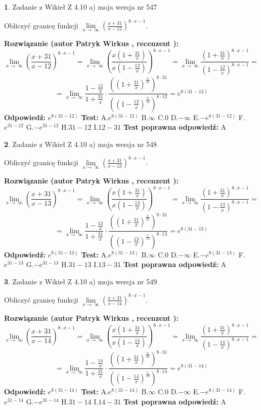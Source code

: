 \documentclass[12pt, a4paper]{article}
\theoremstyle{definition} %
\newtheorem{zad}{}
\newcommand{\zadStart}[1]{\begin{zad}#1\newline}
\newcommand{\zadStop}{\end{zad}}
\newcommand{\rozwStart}[2]{\noindent \textbf{Rozwiązanie (autor #1 , recenzent #2): }\newline}
\newcommand{\rozwStop}{\newline}
\newcommand{\odpStart}{\noindent \textbf{Odpowiedź:}\newline}
\newcommand{\odpStop}{\newline}
\newcommand{\testStart}{\noindent \textbf{Test:}\newline}
\newcommand{\testStop}{\newline}
\newcommand{\kluczStart}{\noindent \textbf{Test poprawna odpowiedź:}\newline}
\newcommand{\kluczStop}{\newline}
\begin{document}
\zadStart{Zadanie z Wikieł Z 4.10 a) moja wersja nr 547}


Obliczyć granicę funkcji  $\lim\limits_{x\to\ \infty}(\frac{x+31}{x-12})^{8\cdot x-1}$.
\zadStop
\rozwStart{Patryk Wirkus}{}
$$\lim\limits_{x\to\ \infty}(\frac{x+31}{x-12})^{8\cdot x-1} = \lim\limits_{x\to\ \infty}(\frac{x(1+\frac{31}{x})}{x(1-\frac{12}{x})})^{8\cdot x-1}=\lim\limits_{x\to\ \infty}\frac{(1+\frac{31}{x})^{8\cdot x-1}}{(1-\frac{12}{x})^{8\cdot x-1}}=$$
$$=\lim\limits_{x\to\ \infty}\frac{1-\frac{12}{x}}{1+\frac{31}{x}}\cdot\frac{((1+\frac{31}{x})^{\frac{x}{31}})^{8\cdot31}}{((1-\frac{12}{x})^{\frac{x}{12}})^{8\cdot12}}=e^{8(31-12)}$$
\rozwStop
\odpStart
$e^{8(31-12)}$
\odpStop
\testStart
A.$e^{8(31-12)}$ B.$\infty$ C.$0$ D.$-\infty$ E.$-e^{8(31-12)}$
F.$e^{31-12}$ G.$-e^{31-12}$
H.$31-12$
I.$12-31$
\testStop
\kluczStart
A
\kluczStop



\zadStart{Zadanie z Wikieł Z 4.10 a) moja wersja nr 548}


Obliczyć granicę funkcji  $\lim\limits_{x\to\ \infty}(\frac{x+31}{x-13})^{8\cdot x-1}$.
\zadStop
\rozwStart{Patryk Wirkus}{}
$$\lim\limits_{x\to\ \infty}(\frac{x+31}{x-13})^{8\cdot x-1} = \lim\limits_{x\to\ \infty}(\frac{x(1+\frac{31}{x})}{x(1-\frac{13}{x})})^{8\cdot x-1}=\lim\limits_{x\to\ \infty}\frac{(1+\frac{31}{x})^{8\cdot x-1}}{(1-\frac{13}{x})^{8\cdot x-1}}=$$
$$=\lim\limits_{x\to\ \infty}\frac{1-\frac{13}{x}}{1+\frac{31}{x}}\cdot\frac{((1+\frac{31}{x})^{\frac{x}{31}})^{8\cdot31}}{((1-\frac{13}{x})^{\frac{x}{13}})^{8\cdot13}}=e^{8(31-13)}$$
\rozwStop
\odpStart
$e^{8(31-13)}$
\odpStop
\testStart
A.$e^{8(31-13)}$ B.$\infty$ C.$0$ D.$-\infty$ E.$-e^{8(31-13)}$
F.$e^{31-13}$ G.$-e^{31-13}$
H.$31-13$
I.$13-31$
\testStop
\kluczStart
A
\kluczStop



\zadStart{Zadanie z Wikieł Z 4.10 a) moja wersja nr 549}


Obliczyć granicę funkcji  $\lim\limits_{x\to\ \infty}(\frac{x+31}{x-14})^{8\cdot x-1}$.
\zadStop
\rozwStart{Patryk Wirkus}{}
$$\lim\limits_{x\to\ \infty}(\frac{x+31}{x-14})^{8\cdot x-1} = \lim\limits_{x\to\ \infty}(\frac{x(1+\frac{31}{x})}{x(1-\frac{14}{x})})^{8\cdot x-1}=\lim\limits_{x\to\ \infty}\frac{(1+\frac{31}{x})^{8\cdot x-1}}{(1-\frac{14}{x})^{8\cdot x-1}}=$$
$$=\lim\limits_{x\to\ \infty}\frac{1-\frac{14}{x}}{1+\frac{31}{x}}\cdot\frac{((1+\frac{31}{x})^{\frac{x}{31}})^{8\cdot31}}{((1-\frac{14}{x})^{\frac{x}{14}})^{8\cdot14}}=e^{8(31-14)}$$
\rozwStop
\odpStart
$e^{8(31-14)}$
\odpStop
\testStart
A.$e^{8(31-14)}$ B.$\infty$ C.$0$ D.$-\infty$ E.$-e^{8(31-14)}$
F.$e^{31-14}$ G.$-e^{31-14}$
H.$31-14$
I.$14-31$
\testStop
\kluczStart
A
\kluczStop
\end{document}
